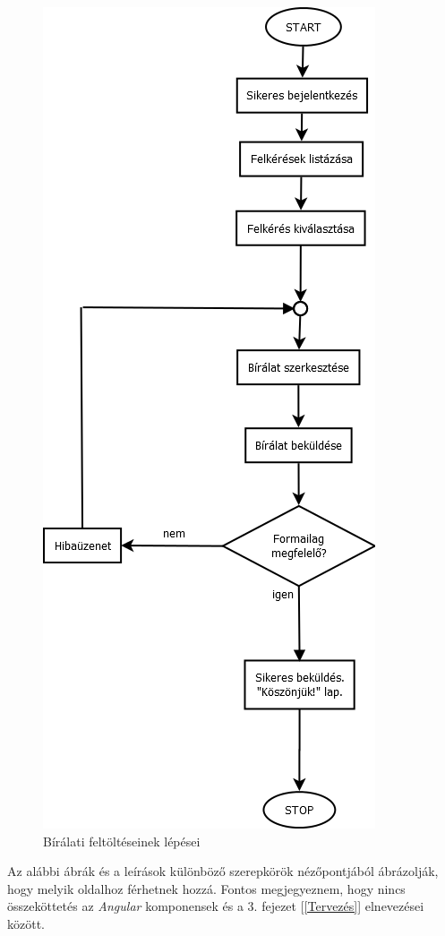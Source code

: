 \begin{figure}[h]
\centering
\includegraphics[scale=0.5]{images/Bírálat_feltöltése.png}
\caption{Bírálati feltöltéseinek lépései}
\label{fig:birala_feltoltese}
\end{figure}

\newpage


Az alábbi ábrák és a leírások különböző szerepkörök nézőpontjából ábrázolják, hogy melyik oldalhoz férhetnek hozzá. Fontos megjegyeznem, hogy nincs összeköttetés az \textit{Angular} \cite{angular} komponensek és a 3. fejezet [\ref{Tervezés}] elnevezései között.

